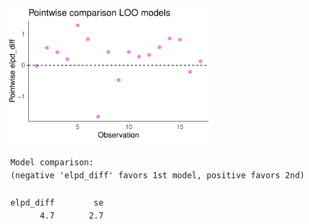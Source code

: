 \documentclass[10pt]{beamer}
\begin{document}
 \begin{frame}

   \\

 \end{frame}

 \begin{frame}[fragile]

   {\includegraphics[width=8cm]{figs/milkelpddiff.pdf}}
   \\
   {\scriptsize
 \begin{lstlisting}
 Model comparison:
 (negative 'elpd_diff' favors 1st model, positive favors 2nd)

 elpd_diff        se
       4.7       2.7
 \end{lstlisting}}

 \end{frame}
\end{document}
